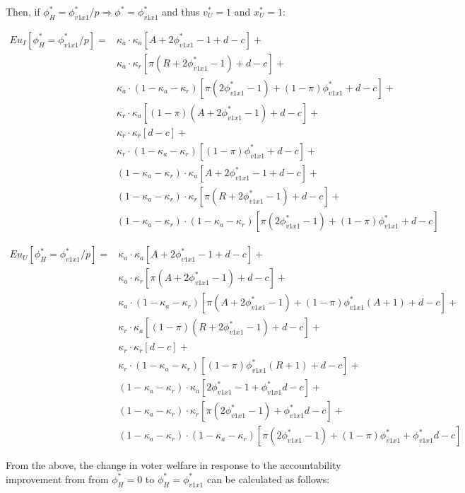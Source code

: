 \noindent Then, if $\phi^*_H = \phi^*_{v1x1}/p \Rightarrow \phi^* = \phi^*_{v1x1}$ and thus $v^*_U=1$ and $x^*_U=1$:

\begin{align*}
	Eu_I[\phi^*_H = \phi^*_{v1x1}/p] =& \kappa_a \cdot \kappa_a [ A + 2\phi^*_{v1x1} - 1 + d - c] + \\
	&\kappa_a \cdot \kappa_r [ \pi(R+2\phi^*_{v1x1}-1) + d - c] + \\
	&\kappa_a \cdot (1-\kappa_a-\kappa_r) [ \pi(2\phi^*_{v1x1}-1) + (1-\pi)\phi^*_{v1x1} + d - c] + \\
	&\kappa_r \cdot \kappa_a [ (1-\pi)(A+2\phi^*_{v1x1}-1) + d - c] + \\
	&\kappa_r \cdot \kappa_r [ d - c ] + \\
	&\kappa_r \cdot (1-\kappa_a-\kappa_r) [ (1-\pi)\phi^*_{v1x1} + d - c] + \\
	&(1-\kappa_a-\kappa_r) \cdot \kappa_a [ A + 2\phi^*_{v1x1}-1 + d - c] + \\
	&(1-\kappa_a-\kappa_r) \cdot \kappa_r [ \pi (R+2\phi^*_{v1x1}-1) + d - c] + \\
	&(1-\kappa_a-\kappa_r) \cdot (1-\kappa_a-\kappa_r) [ \pi (2\phi^*_{v1x1}-1)+ (1-\pi)\phi^*_{v1x1} + d - c ] 
\end{align*}

\begin{align*}
	Eu_U[\phi^*_H = \phi^*_{v1x1}/p] =& \kappa_a \cdot \kappa_a [ A + 2\phi^*_{v1x1} - 1 + d - c] + \\
	&\kappa_a \cdot \kappa_r [ \pi(A+2\phi^*_{v1x1}-1) + d - c] + \\
	&\kappa_a \cdot (1-\kappa_a-\kappa_r) [ \pi(A+2\phi^*_{v1x1}-1) + (1-\pi)\phi^*_{v1x1}(A+1) + d - c] + \\
	&\kappa_r \cdot \kappa_a [ (1-\pi)(R+2\phi^*_{v1x1}-1) + d - c] + \\
	&\kappa_r \cdot \kappa_r [ d - c ] + \\
	&\kappa_r \cdot (1-\kappa_a-\kappa_r) [ (1-\pi)\phi^*_{v1x1}(R+1) + d - c] + \\
	&(1-\kappa_a-\kappa_r) \cdot \kappa_a [ 2\phi^*_{v1x1}-1 + \phi^*_{v1x1} d - c] + \\
	&(1-\kappa_a-\kappa_r) \cdot \kappa_r [ \pi (2\phi^*_{v1x1}-1) + \phi^*_{v1x1} d - c] + \\
	&(1-\kappa_a-\kappa_r) \cdot (1-\kappa_a-\kappa_r) [ \pi (2\phi^*_{v1x1}-1)+ (1-\pi)\phi^*_{v1x1} + \phi^*_{v1x1} d - c ] 
\end{align*}

\par From the above, the change in voter welfare in response to the accountability improvement from from $\phi^*_H=0$ to $\phi^*_H=\phi^*_{v1x1}$ can be calculated as follows:

